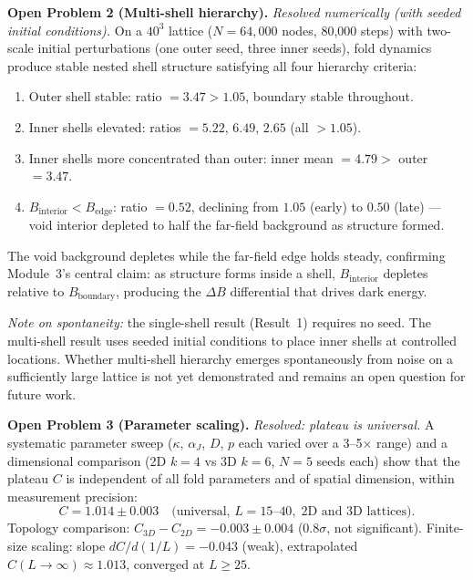 \documentclass[12pt]{article}
\begin{document}
\textbf{Open Problem 2 (Multi-shell hierarchy).}
\textit{Resolved numerically (with seeded initial conditions).}
On a $40^3$ lattice ($N=64{,}000$ nodes, 80{,}000 steps) with
two-scale initial perturbations (one outer seed, three inner seeds),
fold dynamics produce stable nested shell structure satisfying all
four hierarchy criteria:
\begin{enumerate}
  \item Outer shell stable: ratio $= 3.47 > 1.05$,
        boundary stable throughout.
  \item Inner shells elevated: ratios $= 5.22$, $6.49$, $2.65$
        (all $> 1.05$).
  \item Inner shells more concentrated than outer:
        inner mean $= 4.79 >$ outer $= 3.47$.
  \item $B_{\mathrm{interior}} < B_{\mathrm{edge}}$:
        ratio $= 0.52$, declining from $1.05$ (early) to $0.50$
        (late) --- void interior depleted to half the far-field
        background as structure formed.
\end{enumerate}
The void background depletes while the far-field edge holds
steady, confirming Module~3's central claim: as structure forms
inside a shell, $B_{\mathrm{interior}}$ depletes relative to
$B_{\mathrm{boundary}}$, producing the $\Delta B$ differential
that drives dark energy.

\textit{Note on spontaneity:} the single-shell result (Result~1)
requires no seed. The multi-shell result uses seeded initial
conditions to place inner shells at controlled locations.
Whether multi-shell hierarchy emerges spontaneously from noise
on a sufficiently large lattice is not yet demonstrated and
remains an open question for future work.

\textbf{Open Problem 3 (Parameter scaling).}
\textit{Resolved: plateau is universal.}
A systematic parameter sweep ($\kappa$, $\alpha_J$, $D$, $p$
each varied over a 3--5$\times$ range) and a dimensional
comparison (2D $k=4$ vs 3D $k=6$, $N=5$ seeds each) show
that the plateau $C$ is independent of all fold parameters
and of spatial dimension, within measurement precision:
\begin{equation}
  C = 1.014 \pm 0.003 \quad
  \text{(universal, } L=15\text{--}40,\;
  \text{2D and 3D lattices)}.
  \label{eq:C_universal}
\end{equation}
Topology comparison: $C_{3D} - C_{2D} = -0.003 \pm 0.004$
($0.8\sigma$, not significant).
Finite-size scaling: slope $dC/d(1/L) = -0.043$ (weak),
extrapolated $C(L\to\infty) \approx 1.013$, converged at $L \geq 25$.
\end{document}
